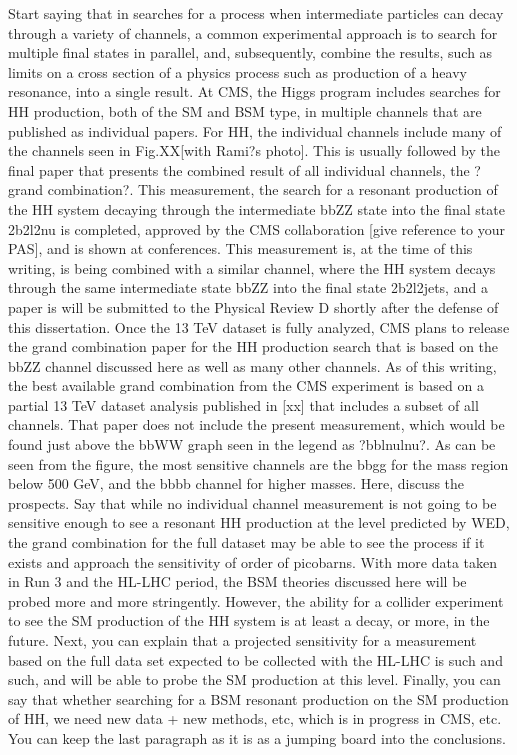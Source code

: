   Start saying that in searches for a process when intermediate particles can decay through
a variety of channels, a common experimental approach is to search for multiple final states
in parallel, and, subsequently, combine the results, such as limits on a cross section of a  
physics process such as  production of a heavy resonance, into a single result. At CMS,
the Higgs program includes searches for HH production, both of the SM and BSM type, in multiple
channels that are published as individual papers. For HH, the individual channels include many
of the channels seen in Fig.XX[with Rami?s photo]. This is usually followed by the final paper
that presents the combined result of all individual channels, the ?grand combination?.
   This measurement, the search for a resonant production of the HH system decaying through
the intermediate bbZZ state into the final state 2b2l2nu is completed, approved by the CMS collaboration
[give reference to your PAS], and is shown at conferences. This measurement is, at the time of
this writing, is being combined with a similar channel, where the HH system decays through the
same intermediate state bbZZ into the final state 2b2l2jets, and a paper is will be submitted to
the Physical Review D shortly after the defense of this dissertation.
   Once the 13 TeV dataset is fully analyzed, CMS plans to release the grand combination paper 
for the HH production search  that is based on the bbZZ channel discussed here as well as many 
other channels. As of this writing, the best available grand combination from the CMS experiment
is based on a partial 13 TeV dataset analysis  published in [xx] that includes a subset of all channels.
That paper does not include the present measurement, which would be found just above the bbWW
graph seen in the legend as ?bblnulnu?. As can be seen from the figure, the most sensitive channels
are the bbgg for the mass region below 500 GeV,  and  the  bbbb channel  for higher masses.
   Here, discuss the prospects. Say that while no individual channel measurement is not  going to be
sensitive enough to see a resonant HH production at the level predicted by WED, the grand combination
for the full dataset may be able  to see the process if it exists and approach the sensitivity of order of
picobarns. With more data taken in Run 3 and the HL-LHC period, the BSM theories discussed here 
will be probed more and more stringently. However, the ability for a collider experiment to see the
SM production of the HH system is at least a decay, or more, in the future.
  Next, you can explain that a projected sensitivity for a measurement based on the full data set
expected to be collected with the HL-LHC is such  and such, and will be able to probe the SM production
at this level.
   Finally, you can say that whether searching for a BSM resonant production on the SM production 
of HH, we need new data  + new methods, etc, which is in progress in CMS, etc.
   You can keep the last paragraph  as  it is as a  jumping  board into the conclusions.
   
